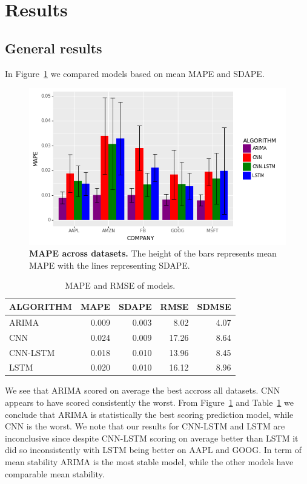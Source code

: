 \documentclass[12pt,journal,compsoc]{IEEEtran}
\begin{document}
\section{Results}
\subsection{General results}
\par In Figure~\ref{fig:res1} we compared models based on mean MAPE and SDAPE.
\begin{figure}[!ht]\centering
	\includegraphics[width=\linewidth]{images/fig1.png}
	\caption{\textbf{MAPE across datasets.} The height of the bars represents mean MAPE with the lines representing SDAPE.}
	\label{fig:res1}
\end{figure}
\begin{table}[hbt]
	\caption{MAPE and RMSE of models.}
	\centering
	\begin{tabular}{|l|r|r|r|r|}
	    \hline
        \toprule
        ALGORITHM &  MAPE &  SDAPE &  RMSE &  SDMSE \\
        \hline
        \midrule
            ARIMA & 0.009 &  0.003 &  8.02 &   4.07 \\
              CNN & 0.024 &  0.009 & 17.26 &   8.64 \\
         CNN-LSTM & 0.018 &  0.010 & 13.96 &   8.45 \\
             LSTM & 0.020 &  0.010 & 16.12 &   8.96 \\
        \hline
        \bottomrule
    \end{tabular}
	\label{tab:res1}
\end{table}
We see that ARIMA scored on average the best accross all datasets. 
CNN appears to have scored consistently the worst.
From Figure~\ref{fig:res1}  and Table~\ref{tab:res1} we conclude that ARIMA is statistically the best scoring prediction model, while CNN is the worst.
We note that our results for CNN-LSTM and LSTM are inconclusive since despite CNN-LSTM scoring on average better than LSTM it did so inconsistently with LSTM being better on AAPL and GOOG.
In term of mean stability ARIMA is the most stable model, while the other models have comparable mean stability.
\end{document}

